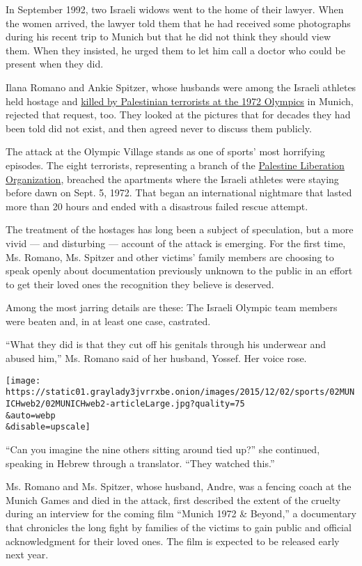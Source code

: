 In September 1992, two Israeli widows went to the home of their lawyer.
When the women arrived, the lawyer told them that he had received some
photographs during his recent trip to Munich but that he did not think
they should view them. When they insisted, he urged them to let him call
a doctor who could be present when they did.

Ilana Romano and Ankie Spitzer, whose husbands were among the Israeli
athletes held hostage and
\href{http://timesmachine.nytimes3xbfgragh.onion/timesmachine/1972/09/06/issue.html}{killed
by Palestinian terrorists at the 1972 Olympics} in Munich, rejected that
request, too. They looked at the pictures that for decades they had been
told did not exist, and then agreed never to discuss them publicly.

The attack at the Olympic Village stands as one of sports' most
horrifying episodes. The eight terrorists, representing a branch of the
\href{http://topics.nytimes3xbfgragh.onion/top/reference/timestopics/organizations/p/palestine_liberation_organization/index.html?inline=nyt-org}{Palestine
Liberation Organization}, breached the apartments where the Israeli
athletes were staying before dawn on Sept. 5, 1972. That began an
international nightmare that lasted more than 20 hours and ended with a
disastrous failed rescue attempt.

The treatment of the hostages has long been a subject of speculation,
but a more vivid --- and disturbing --- account of the attack is
emerging. For the first time, Ms. Romano, Ms. Spitzer and other victims'
family members are choosing to speak openly about documentation
previously unknown to the public in an effort to get their loved ones
the recognition they believe is deserved.

Among the most jarring details are these: The Israeli Olympic team
members were beaten and, in at least one case, castrated.

``What they did is that they cut off his genitals through his underwear
and abused him,'' Ms. Romano said of her husband, Yossef. Her voice
rose.

\texttt{[image: https://static01.graylady3jvrrxbe.onion/images/2015/12/02/sports/02MUNICHweb2/02MUNICHweb2-articleLarge.jpg?quality=75\\\&auto=webp\\\&disable=upscale]}

``Can you imagine the nine others sitting around tied up?'' she
continued, speaking in Hebrew through a translator. ``They watched
this.''

Ms. Romano and Ms. Spitzer, whose husband, Andre, was a fencing coach at
the Munich Games and died in the attack, first described the extent of
the cruelty during an interview for the coming film ``Munich 1972 \&
Beyond,'' a documentary that chronicles the long fight by families of
the victims to gain public and official acknowledgment for their loved
ones. The film is expected to be released early next year.

